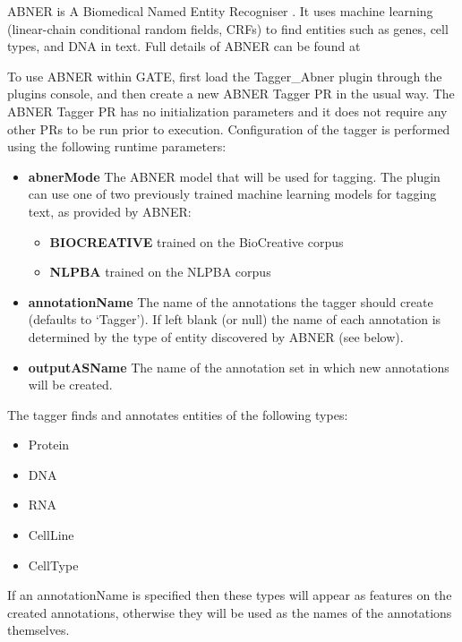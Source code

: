 
ABNER is A Biomedical Named Entity Recogniser \cite{Settles05}. It uses machine learning
(linear-chain conditional random fields, CRFs) to find entities such as
genes, cell types, and DNA in text. Full details of ABNER can be found at

To use ABNER within GATE, first load the Tagger\_Abner plugin through the plugins console,
and then create a new ABNER Tagger PR in the usual way. The ABNER Tagger PR has no
initialization parameters and it does not require any other PRs to be run
prior to execution. Configuration of the tagger is performed using the following
runtime parameters:

\begin{itemize}
\item \textbf{abnerMode} The ABNER model that will be used for tagging. The
  plugin can use one of two previously trained machine learning models for
  tagging text, as provided by ABNER:
  \begin{itemize}
  \item \textbf{BIOCREATIVE} trained on the BioCreative corpus
  \item \textbf{NLPBA} trained on the NLPBA corpus
  \end{itemize}
\item \textbf{annotationName} The name of the annotations the tagger should create
  (defaults to `Tagger'). If left blank (or null) the name of each annotation is
  determined by the type of entity discovered by ABNER (see below).
\item \textbf{outputASName} The name of the annotation set in which new
  annotations will be created.
\end{itemize}

The tagger finds and annotates entities of the following types:
\begin{itemize}
\item Protein
\item DNA
\item RNA
\item CellLine
\item CellType
\end{itemize}

If an annotationName is specified then these types will appear as features on the
created annotations, otherwise they will be used as the names of the annotations themselves.


